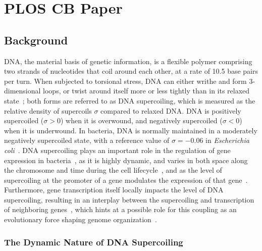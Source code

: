 \chapter{PLOS CB Paper}
\label{chap:ploscb}

\section{Background}

DNA, the material basis of genetic information, is a flexible polymer comprising two strands of nucleotides that coil around each other, at a rate of 10.5 base pairs per turn.
When subjected to torsional stress, DNA can either writhe and form 3-dimensional loops, or twist around itself more or less tightly than in its relaxed state~\citep{travers2005}; both forms are referred to as DNA supercoiling, which is measured as the relative density of supercoils $\sigma$ compared to relaxed DNA.
DNA is positively supercoiled ($\sigma > 0$) when it is overwound, and negatively supercoiled ($\sigma < 0$) when it is underwound.
In bacteria, DNA is normally maintained in a moderately negatively supercoiled state, with a reference value of $\sigma=-0.06$ in \emph{Escherichia coli}~\citep{travers2005}.
DNA supercoiling plays an important role in the regulation of gene expression in bacteria~\citep{martisb.2019}, as it is highly dynamic, and varies in both space along the chromosome and time during the cell lifecycle~\citep{krogh2018}, and as the level of supercoiling at the promoter of a gene modulates the expression of that gene~\citep{forquet2021}.
Furthermore, gene transcription itself locally impacts the level of DNA supercoiling, resulting in an interplay between the supercoiling and transcription of neighboring genes~\citep{meyer2014}, which hints at a possible role for this coupling as an evolutionary force shaping genome organization~\citep{junier2016}.

\subsection{The Dynamic Nature of DNA Supercoiling}

